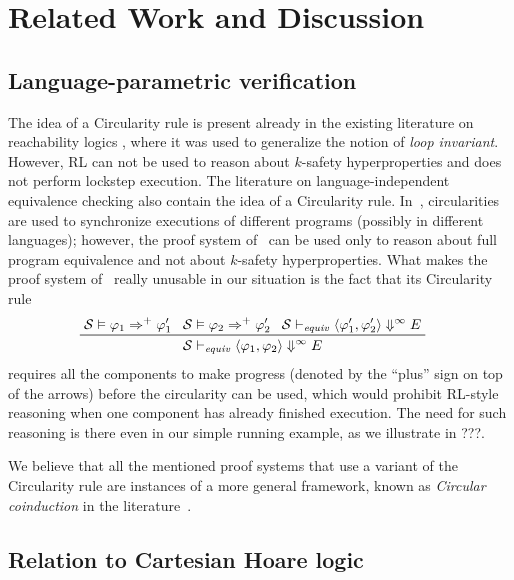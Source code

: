 
\section{Related Work and Discussion}\label{sec:discussion}

\subsection{Language-parametric verification}

The idea of a Circularity rule is present already 
in the existing literature on reachability logics \cite{RosuS12oopsla,RosuSCM13lics,StefanescuCMMSR19},
where it was used to generalize the notion of \emph{loop invariant}.
However, RL can not be used to reason about $k$-safety hyperproperties and does not perform lockstep execution.
The literature on language-independent equivalence checking also contain the idea of a Circularity rule.
In~\cite{CiobacaLRR16}, circularities are used to synchronize executions of different programs (possibly in different languages);
however, the proof system of~\cite{CiobacaLRR16} can be used only to reason about full program equivalence
and not about $k$-safety hyperproperties.
What makes the proof system of~\cite{CiobacaLRR16} really unusable in our situation is the fact that its
Circularity rule
\begin{align*}
  & \prftree[l]{}
    { \mathcal{S} \vDash \varphi_1 \Rightarrow^+ \varphi^\prime_1 }
    { \mathcal{S} \vDash \varphi_2 \Rightarrow^+ \varphi^\prime_2 }
    { \mathcal{S} \vdash_{\mathit{equiv}} \langle \varphi^\prime_1, \varphi^\prime_2 \rangle \Downarrow^{\infty} E}
    { \mathcal{S} \vdash_{\mathit{equiv}} \langle \varphi_1, \varphi_2 \rangle \Downarrow^{\infty} E}
\end{align*}
requires all the components to make progress (denoted by the ``plus'' sign on top of the arrows) before the circularity can be used,
which would prohibit RL-style reasoning when one component has already finished execution.
The need for such reasoning is there even in our simple running example, as we illustrate in ???.

We believe that all the mentioned proof systems that use a variant of the Circularity rule are instances of a more general
framework, known as \emph{Circular coinduction} in the literature~\cite{RosuL09CircularCoinduction}.



\subsection{Relation to Cartesian Hoare logic}

